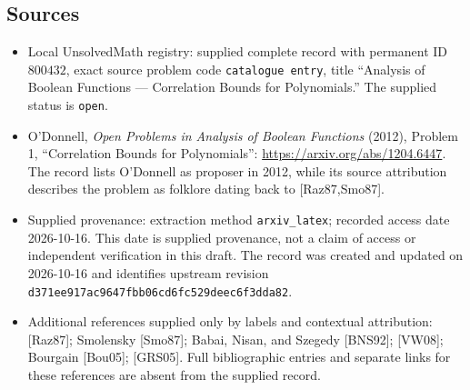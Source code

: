 \documentclass[11pt]{article}
\begin{document}
\subsection{Sources}
\begin{itemize}
\item Local UnsolvedMath registry: supplied complete record with permanent ID \(800432\), exact source problem code \texttt{catalogue entry}, title ``Analysis of Boolean Functions --- Correlation Bounds for Polynomials.'' The supplied status is \texttt{open}.
\item O'Donnell, \emph{Open Problems in Analysis of Boolean Functions} (2012), Problem 1, ``Correlation Bounds for Polynomials'': \url{https://arxiv.org/abs/1204.6447}. The record lists O'Donnell as proposer in 2012, while its source attribution describes the problem as folklore dating back to [Raz87,Smo87].
\item Supplied provenance: extraction method \texttt{arxiv\_latex}; recorded access date 2026-10-16. This date is supplied provenance, not a claim of access or independent verification in this draft. The record was created and updated on 2026-10-16 and identifies upstream revision \texttt{d371ee917ac9647fbb06cd6fc529deec6f3dda82}.
\item Additional references supplied only by labels and contextual attribution: [Raz87]; Smolensky [Smo87]; Babai, Nisan, and Szegedy [BNS92]; [VW08]; Bourgain [Bou05]; [GRS05]. Full bibliographic entries and separate links for these references are absent from the supplied record.
\end{itemize}
\end{document}
